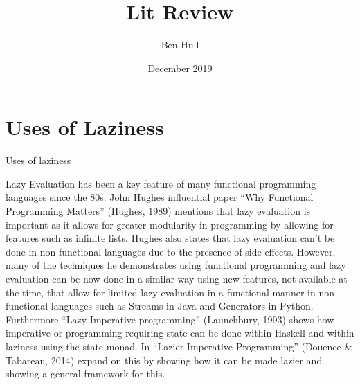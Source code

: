 \documentclass{article}
\title{Lit Review}
\author{Ben Hull }
\date{December 2019}
\begin{document}
\maketitle

\section{Uses of Laziness}

Uses of laziness

Lazy Evaluation has been a key feature of many functional programming languages since the 80s. John Hughes influential paper “Why Functional Programming Matters” (Hughes, 1989) mentions that lazy evaluation is important as it allows for greater modularity in programming by allowing for features such as infinite lists. Hughes also states that lazy evaluation can’t be done in non functional languages due to the presence of side effects. However, many of the techniques he demonstrates using functional programming and lazy evaluation can be now done in a similar way using new features, not available at the time, that allow for limited lazy evaluation in a functional manner in non functional languages such as Streams in Java and Generators in Python. Furthermore “Lazy Imperative programming”  (Launchbury, 1993) shows how imperative or programming requiring state can be done within Haskell and within laziness using the state monad.  In “Lazier Imperative Programming” (Douence & Tabareau, 2014) expand on this by showing how it can be made lazier and showing a general framework for this. 
\end{document}
